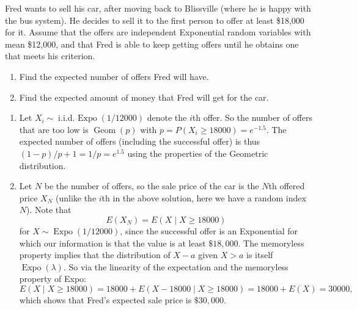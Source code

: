 

\setcounter{theorem}{37}
\begin{exercise}[BH.5.38] Fred wants to sell his car, after moving back to Blissville (where he is happy with
	the bus system). He decides to sell it to the first person to offer at least \$18,000 for
	it. Assume that the offers are independent Exponential random variables with mean
	\$12,000, and that Fred is able to keep getting offers until he obtains one that meets his
	criterion.
	\begin{enumerate}
		\item Find the expected number of offers Fred will have.
		\item  Find the expected amount of money that Fred will get for the car.
	\end{enumerate} 
\begin{solution}
    \begin{enumerate}
        \item Let $X_i \sim \operatorname{i.i.d.~ Expo}(1 / 12000)$ denote the $i$th offer. So the number of offers that are too low is $\operatorname{Geom}(p)$ with $p=P\left(X_i \geq 18000\right)=e^{-1.5}$. The expected number of offers (including the successful offer) is thus $(1-p) / p+1=1 / p=e^{1.5}$ using the properties of the Geometric distribution.
        \item Let $N$ be the number of offers, so the sale price of the car is the $N$th offered price $X_N$ (unlike the $i$th in the above solution, here we have a random index $N$). Note that
        $$
        E\left(X_N\right)=E(X \mid X \geq 18000)
        $$
        for $X \sim \operatorname{Expo}(1 / 12000)$, since the successful offer is an Exponential for which our information is that the value is at least $\$ 18,000$. The memoryless property implies that the distribution of $X-a$ given $X>a$ is itself $\operatorname{Expo}(\lambda)$. So via the linearity of the expectation and the memoryless property of Expo:
        $$
        E(X \mid X \geq 18000)=	18000+		E(X-18000 \mid X \geq 18000)=18000+E(X)=30000,
        $$
        which shows that Fred's expected sale price is $\$ 30,000$.
    \end{enumerate} 
\end{solution}
\end{exercise}


